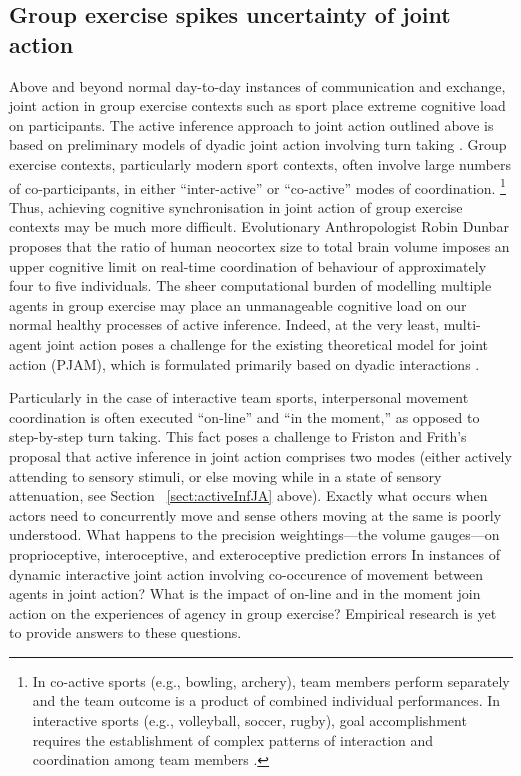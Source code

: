 \begin{CJK}{UTF8}{gbsn}
    \subsection{Group exercise spikes uncertainty of joint action}


    Above and beyond normal day-to-day instances of communication and exchange, joint action in group exercise contexts such as sport place extreme cognitive load on participants. The active inference approach to joint action outlined above is based on preliminary models of dyadic joint action involving turn taking \citep[i.e., in bird song exchanges][]{Friston2015}.  Group exercise contexts, particularly modern sport contexts, often involve large numbers of co-participants, in either ``inter-active'' or ``co-active'' modes of coordination.
        \footnote{
        In co-active sports (e.g., bowling, archery), team members perform separately and the team outcome is a product of combined individual performances. In interactive sports (e.g., volleyball, soccer, rugby), goal accomplishment requires the establishment of complex patterns of interaction and coordination among team members \citep{Filho2014}.
        }
    Thus, achieving cognitive synchronisation in joint action of group exercise contexts may be much more difficult.  Evolutionary Anthropologist Robin Dunbar \textcite{Dunbar1992} proposes that the ratio of human neocortex size to total brain volume imposes an upper cognitive limit on real-time coordination of behaviour of approximately four to five individuals.  The sheer computational burden of modelling multiple agents in group exercise may place an unmanageable cognitive load on our normal healthy processes of active inference.  Indeed, at the very least, multi-agent joint action poses a challenge for the existing theoretical model for joint action (PJAM), which is formulated primarily based on dyadic interactions \citep{Pesquita2017}.

    Particularly in the case of interactive team sports, interpersonal movement coordination is often executed ``on-line'' and ``in the moment,'' as opposed to step-by-step turn taking.  This fact poses a challenge to Friston and Frith's proposal that active inference in joint action comprises two modes (either actively attending to sensory stimuli, or else moving while in a state of sensory attenuation, see Section ~\ref{sect:activeInfJA} above).  Exactly what occurs when actors need to concurrently move and sense others moving at the same is poorly understood.  What happens to the precision weightings---the volume gauges---on proprioceptive, interoceptive, and exteroceptive prediction errors In instances of dynamic interactive joint action involving co-occurence of movement between agents in joint action?   What is the impact of on-line and in the moment join action on the experiences of agency in group exercise?  Empirical research is yet to provide answers to these questions.


\end{CJK}
